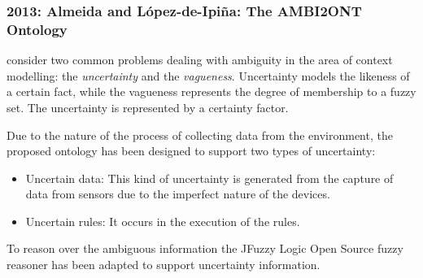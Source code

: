 \subsubsection{2013: Almeida and López-de-Ipiña: The AMBI2ONT Ontology}
\label{sec:almeida}

\citet{almeida_assessing_2012} consider two common problems dealing with 
ambiguity in the area of context modelling: the \textit{uncertainty} and the 
\textit{vagueness}. Uncertainty models the likeness of a certain fact, while the 
vagueness represents the degree of membership to a fuzzy set. The uncertainty is 
represented by a certainty factor.

Due to the nature of the process of collecting data from the environment, the
proposed ontology has been designed to support two types of uncertainty:

\begin{itemize}
  \item Uncertain data: This kind of uncertainty is generated from the capture
  of data from sensors due to the imperfect nature of the devices.
  \item Uncertain rules: It occurs in the execution of the rules. 
\end{itemize}

To reason over the ambiguous information the JFuzzy Logic Open Source fuzzy
reasoner has been adapted to support uncertainty information.
